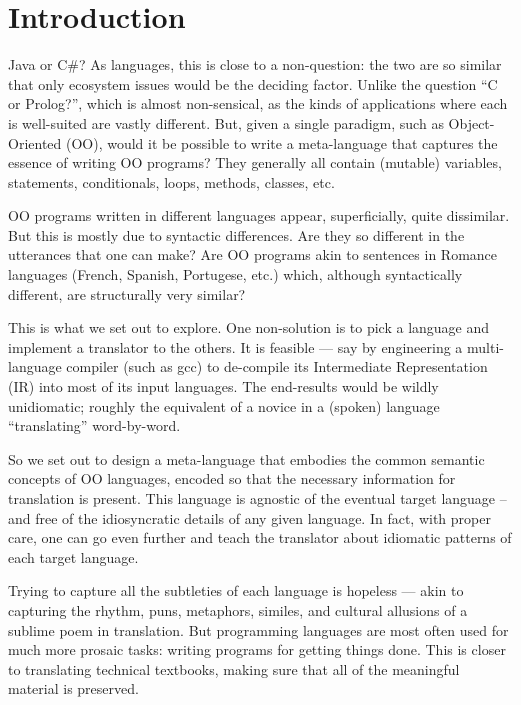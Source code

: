 \documentclass[sigplan,review,prologue,dvipsnames]{acmart}
\newcommand{\Csharp}{C\#}
\begin{document}


\maketitle

\section{Introduction}

Java or \Csharp? As languages, this is close to a 
non-question: the two are so similar that only ecosystem issues
would be the deciding factor.  Unlike the question ``C or Prolog?'', which
is almost non-sensical, as the kinds of applications where each
is well-suited are vastly different.  But, given a single
paradigm, such as Object-Oriented (OO), would it be possible to
write a meta-language that captures the essence of writing
OO programs?  They generally all contain (mutable)
variables, statements, conditionals, loops, methods, classes, etc.

OO programs written in different languages appear, superficially,
quite dissimilar. But this is mostly due to
syntactic differences. Are they so different in the utterances that
one can make? Are OO programs akin to sentences in
Romance languages (French, Spanish, Portugese, etc.) which, although 
syntactically different,
are structurally very similar?

This is what we set out to explore.  One non-solution is to pick a
language and implement a translator to the others.
It is feasible --- say by 
engineering a multi-language compiler (such as gcc) to de-compile its Intermediate 
Representation (IR) into most of its input languages.  The end-results would 
be wildly unidiomatic; roughly the equivalent of a novice
in a (spoken) language ``translating'' word-by-word.

So we set out to design a meta-language that embodies
the common semantic concepts of OO languages, encoded so that the
necessary information for translation is present.  This language is
agnostic of the eventual target language -- and free of
the idiosyncratic details of any given language.
In fact, with proper care, one can go even further and
teach the translator about idiomatic patterns of each target language.

Trying to capture all the subtleties of each language is hopeless ---
akin to capturing the rhythm, puns, metaphors, similes,
and cultural allusions of a sublime poem in translation.  But programming
languages are most often used for much more prosaic tasks: writing programs
for getting things done. This is closer to translating technical textbooks,
making sure that all of the meaningful material is preserved.
\end{document}
